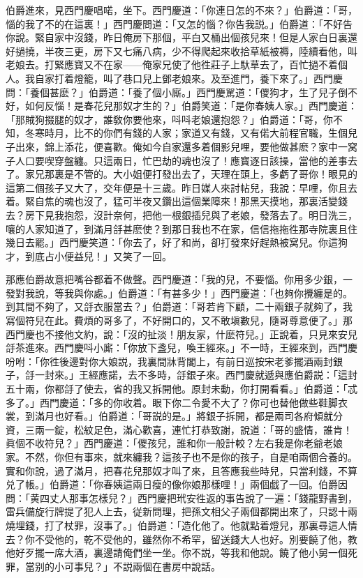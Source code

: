 伯爵進來，見西門慶唱喏，坐下。西門慶道：「你連日怎的不來？」伯爵道：「哥，惱的我了不的在這裏！」西門慶問道：「又怎的惱？你告我説。」伯爵道：「不好告你說。緊自家中沒錢，昨日俺房下那個，平白又桶出個孩兒來！但是人家白日裏還好撾撓，半夜三更，房下又七痛八病，少不得爬起來收拾草紙被褥，陸續看他，叫老娘去。打緊應寳又不在家——俺家兄使了他徃莊子上馱草去了，百忙撾不着個人。我自家打着燈籠，叫了巷口兒上鄧老娘來。及至進門，養下來了。」西門慶問：「養個甚麽？」伯爵道：「養了個小廝。」西門慶駡道：「儍狗才，生了兒子倒不好，如何反惱！是春花兒那奴才生的？」伯爵笑道：「是你春姨人家。」西門慶道：「那賊狗掇腿的奴才，誰敎你要他來，呌呌老娘還抱怨？」伯爵道：「哥，你不知，冬寒時月，比不的你們有錢的人家；家道又有錢，又有偌大前程官職，生個兒子出來，錦上添花，便喜歡。俺如今自家還多着個影兒哩，要他做甚麽？家中一窝子人口要喫穿盤纏。只這兩日，忙巴劫的魂也沒了！應寳逐日該操，當他的差事去了。家兄那裏是不管的。大小姐便打發出去了，天理在頭上，多虧了哥你！眼見的這第二個孩子又大了，交年便是十三歲。昨日媒人來討帖兒，我說：早哩，你且去着。緊自焦的魂也沒了，猛可半夜又鑽出這個業障來！那黑天摸地，那裏活變錢去？房下見我抱怨，沒計奈何，把他一根銀插兒與了老娘，發落去了。明日洗三，嚷的人家知道了，到滿月㧱甚麽使？到那日我也不在家，信信拖拖徃那寺院裏且住幾日去罷。」西門慶笑道：「你去了，好了和尚，卻打發來好趕熱被窝兒。你這狗才，到底占小便益兒！」又笑了一回。

那應伯爵故意把嘴谷都着不做聲。西門慶道：「我的兒，不要惱。你用多少銀，一發對我說，等我與你處。」伯爵道：「有甚多少！」西門慶道：「也夠你攪纏是的。到其間不夠了，又㧱衣服當去？」伯爵道：「哥若肯下顧，二十兩銀子就夠了，我寫個符兒在此。費煩的哥多了，不好開口的，又不敢塡數兒，隨哥尊意便了。」那西門慶也不接他文約，說：「沒的扯淡！朋友家，什麽符兒。」正說着，只見來安兒㧱茶進來。西門慶呌小廝：「你放下盞兒，喚王經來。」不一時，王經來到，西門慶吩咐：「你徃後邊對你大娘説，我裏間牀背閣上，有前日巡按宋老爹擺酒兩封銀子，㧱一封來。」王經應諾，去不多時，㧱銀子來。西門慶就遞與應伯爵説：「這封五十兩，你都㧱了使去，省的我又拆開他。原封未動，你打開看看。」伯爵道：「忒多了。」西門慶道：「多的你收着。眼下你二令愛不大了？你可也替他做些鞋脚衣裳，到滿月也好看。」伯爵道：「哥説的是。」將銀子拆開，都是兩司各府傾就分資，三兩一錠，松紋足色，滿心歡喜，連忙打恭致謝，說道：「哥的盛情，誰肯！眞個不收符兒？」西門慶道：「儍孩兒，誰和你一般計較？左右我是你老爺老娘家。不然，你但有事來，就來纏我？這孩子也不是你的孩子，自是咱兩個合養的。實和你說，過了滿月，把春花兒那奴才叫了來，且答應我些時兒，只當利錢，不算兑了帳。」伯爵道：「你春姨這兩日瘦的像你娘那樣哩！」兩個戯了一回。伯爵因問：「黄四丈人那事怎樣兒？」西門慶把玳安徃返的事告說了一遍：「錢龍野書到，雷兵備旋行牌提了犯人上去，従新問理，把孫文相父子兩個都開出來了，只認十兩燒埋錢，打了杖罪，沒事了。」伯爵道：「造化他了。他就點着燈兒，那裏尋這人情去？你不受他的，乾不受他的，雖然你不希罕，留送錢大人也好。別要饒了他，教他好歹擺一席大酒，裏邊請俺們坐一坐。你不説，等我和他說。饒了他小舅一個死罪，當别的小可事兒？」不説兩個在書房中說話。

